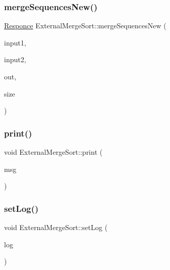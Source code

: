 \subsubsection{\texorpdfstring{merge\+Sequences\+New()}{mergeSequencesNew()}}
{\footnotesize\ttfamily \hyperlink{_structures_8h_a9864d6ef28dd6e38416afac4426b3491}{Responce} External\+Merge\+Sort\+::merge\+Sequences\+New (\begin{DoxyParamCaption}\item[{\hyperlink{class_file_manager}{File\+Manager} $\ast$}]{input1,  }\item[{\hyperlink{class_file_manager}{File\+Manager} $\ast$}]{input2,  }\item[{\hyperlink{class_file_manager}{File\+Manager} $\ast$}]{out,  }\item[{long long}]{size }\end{DoxyParamCaption})\hspace{0.3cm}{\ttfamily [private]}}

\hypertarget{class_external_merge_sort_a5e19d768fb9ef81e36e22e2eff498ca4}{}\label{class_external_merge_sort_a5e19d768fb9ef81e36e22e2eff498ca4} 
\subsubsection{\texorpdfstring{print()}{print()}}
{\footnotesize\ttfamily void External\+Merge\+Sort\+::print (\begin{DoxyParamCaption}\item[{const char $\ast$}]{msg }\end{DoxyParamCaption})\hspace{0.3cm}{\ttfamily [private]}}

\hypertarget{class_external_merge_sort_ac0eeaba67ee0703acf73a8a5bf78ebe1}{}\label{class_external_merge_sort_ac0eeaba67ee0703acf73a8a5bf78ebe1} 
\subsubsection{\texorpdfstring{set\+Log()}{setLog()}}
{\footnotesize\ttfamily void External\+Merge\+Sort\+::set\+Log (\begin{DoxyParamCaption}\item[{\hyperlink{_structures_8h_af67907baa897e9fb84df0cb89795b87c}{Log\+Type}}]{log }\end{DoxyParamCaption})}

